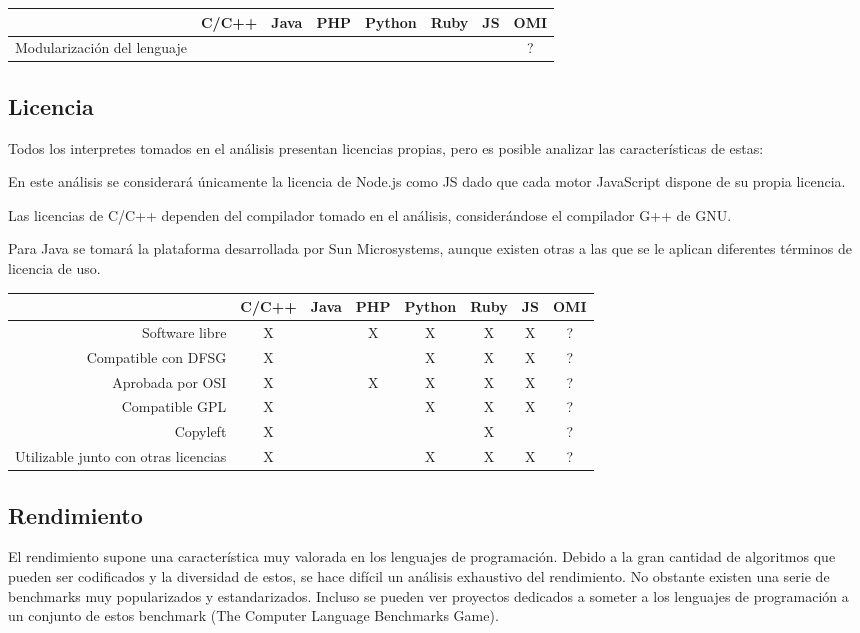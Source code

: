 \FloatBarrier
\begin{table}[h]
\begin{center}
\begin{tabular}{|r|c|c|c|c|c|c|c|} \hline
 & C/C++ & Java & PHP  & Python & Ruby & JS & OMI\\ \hline
Modularización del lenguaje & & &  &  &  &   & ? \\ \hline
\end{tabular}
\end{center}
\end{table}
\FloatBarrier


\subsection{Licencia}
Todos los interpretes tomados en el análisis presentan licencias propias, pero es
posible analizar las características de estas:

En este análisis se considerará únicamente la licencia de Node.js como JS
dado que cada motor JavaScript dispone de su propia licencia. 

Las licencias de C/C++ dependen del compilador tomado en el análisis, considerándose el 
compilador G++ de GNU.

Para Java se tomará la plataforma desarrollada por Sun Microsystems, aunque   
existen otras a las que se le aplican diferentes términos de licencia de uso.

\FloatBarrier
\begin{table}[h]
\begin{center}
\begin{tabular}{|r|c|c|c|c|c|c|c|} \hline
 & C/C++ & Java & PHP  & Python & Ruby & JS & OMI\\ \hline
Software libre & X &  & X & X & X & X  & ? \\ \hline
Compatible con DFSG & X & &  & X & X & X  & ? \\ \hline
Aprobada por OSI & X & & X & X & X &  X & ? \\ \hline
Compatible GPL & X & &  & X & X  & X  & ?  \\ \hline
Copyleft & X & &  & & X &   & ? \\ \hline
Utilizable junto con otras licencias & X & &  & X & X &  X & ? \\ \hline
\end{tabular}
\end{center}
\end{table}
\FloatBarrier

\subsection{Rendimiento}
El rendimiento supone una característica muy valorada en los lenguajes de programación. 
Debido a la gran cantidad de algoritmos que pueden ser codificados y la diversidad de estos, se hace difícil un análisis exhaustivo del rendimiento.
No obstante existen una serie de benchmarks muy popularizados y estandarizados. Incluso se pueden ver proyectos dedicados a someter 
a los lenguajes de programación a un conjunto de estos benchmark (The Computer Language Benchmarks Game).

